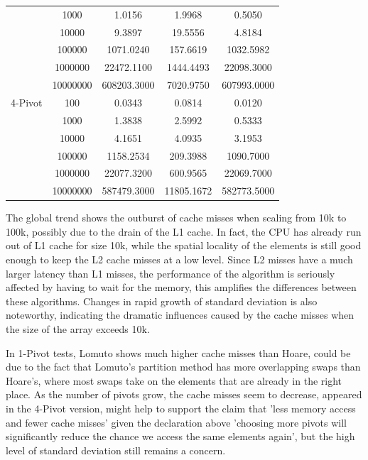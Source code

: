 \documentclass{article}
\begin{document}
\begin{center}
\begin{tabular}{ |c c | c c c| }
                        & 1000     & 1.0156         & 1.9968        & 0.5050 \\
                        & 10000    & 9.3897         & 19.5556       & 4.8184 \\
                        & 100000   & 1071.0240      & 157.6619      & 1032.5982 \\
                        & 1000000  & 22472.1100     & 1444.4493     & 22098.3000 \\
                        & 10000000 & 608203.3000    & 7020.9750     & 607993.0000 \\
        \hline
        4-Pivot         & 100      & 0.0343         & 0.0814        & 0.0120 \\
                        & 1000     & 1.3838         & 2.5992        & 0.5333 \\
                        & 10000    & 4.1651         & 4.0935        & 3.1953 \\
                        & 100000   & 1158.2534      & 209.3988      & 1090.7000 \\
                        & 1000000  & 22077.3200     & 600.9565      & 22069.7000 \\
                        & 10000000 & 587479.3000    & 11805.1672    & 582773.5000 \\
        \hline
    \end{tabular}
\end{center}

The global trend shows the outburst of cache misses when scaling from 10k to 100k, possibly due to the drain of the L1 cache.
In fact, the CPU has already run out of L1 cache for size 10k, while the spatial locality of the elements is still good enough to keep the L2 cache misses at a low level.
Since L2 misses have a much larger latency than L1 misses, the performance of the algorithm is seriously affected by having to wait for the memory, this amplifies the differences between these algorithms.
Changes in rapid growth of standard deviation is also noteworthy, indicating the dramatic influences caused by the cache misses when the size of the array exceeds 10k.

In 1-Pivot tests, Lomuto shows much higher cache misses than Hoare, could be due to the fact that Lomuto's partition method has more overlapping swaps than Hoare's,
where most swaps take on the elements that are already in the right place. As the number of pivots grow, the cache misses seem to decrease, appeared in the 4-Pivot version,
might help to support the claim that 'less memory access and fewer cache misses' given the declaration above 'choosing more pivots will significantly reduce the chance we access the same elements again',
but the high level of standard deviation still remains a concern.
\end{document}
